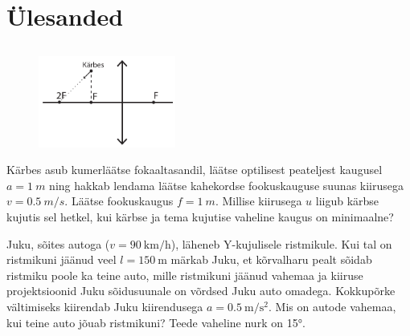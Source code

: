 \documentclass[10pt]{article}
\begin{document}
        \section{Ülesanded}
        \toggleStatement
        \subsection{\protect{}}

\graphicspath{{../probs_b3/}}


\begin{figure}
	\vspace{-30pt}
	\begin{center}
		\hspace{-20pt}
		\includegraphics[width = 0.4\textwidth]{2018-lahg-01-yl.pdf}
	\end{center}
\end{figure}
Kärbes asub kumerläätse fokaaltasandil, läätse optilisest peateljest kaugusel $a = \SI{1}{m}$ ning hakkab lendama läätse kahekordse fookuskauguse suunas kiirusega $v = \SI{0,5}{m/s}$. Läätse fookuskaugus $f = \SI{1}{m}$. Millise kiirusega $u$ liigub kärbse kujutis sel hetkel, kui kärbse ja tema kujutise vaheline kaugus on minimaalne?
\probend
\bigskip


Juku, sõites autoga ($v = \SI{90}{\kilo\meter\per\hour}$), läheneb Y-kujulisele ristmikule. Kui tal on ristmikuni jäänud veel $l = \SI{150}{\meter}$ märkab Juku, et kõrvalharu pealt sõidab ristmiku poole ka teine auto, mille ristmikuni jäänud vahemaa ja kiiruse projektsioonid Juku sõidusuunale on võrdsed Juku auto omadega. Kokkupõrke vältimiseks kiirendab Juku kiirendusega $a = \SI{0.5}{\meter\per\second\squared}$. Mis on autode vahemaa, kui teine auto jõuab ristmikuni? Teede vaheline nurk on \ang{15}.
\probend
\bigskip
\end{document}
